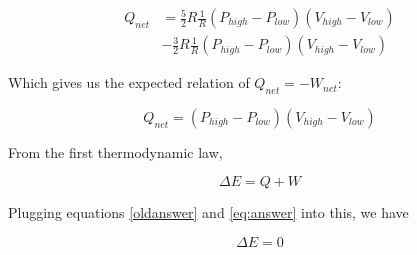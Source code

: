 \documentclass[12pt,a4paper,twocolumn]{article}
\begin{document}
\begin{align}
	Q_{net} & = \frac{5}{2} R \frac{1}{R} \left( P_{high} - P_{low} \right) \left( V_{high} - V_{low} \right) \nonumber \\
	& -\frac{3}{2} R \frac{1}{R} \left( P_{high} - P_{low} \right) \left( V_{high} - V_{low} \right) \label{eq:Wnetideal}
\end{align}

Which gives us the expected relation of $Q_{net} = -W_{net}$:

\begin{equation}\label{eq:answer}
	Q_{net} = \left( P_{high} - P_{low} \right) \left( V_{high} - V_{low} \right)
\end{equation}

From the first thermodynamic law,

\begin{equation}\label{eq:1stlaw}
	\Delta E = Q + W
\end{equation}

Plugging equations \eqref{oldanswer} and \eqref{eq:answer} into this, we have

\begin{equation}\label{eq:energychange}
	\Delta E = 0
\end{equation}
\end{document}
